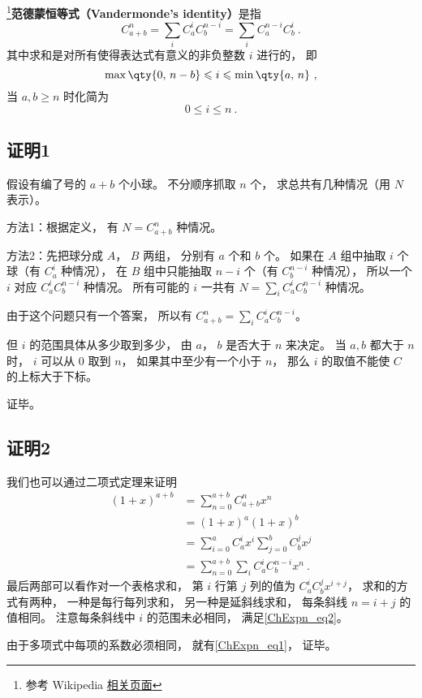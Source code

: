 

\footnote{参考 Wikipedia \href{https://en.wikipedia.org/wiki/Vandermonde's_identity}{相关页面}}\textbf{范德蒙恒等式（Vandermonde's identity）}是指
\begin{equation}\label{ChExpn_eq1}
C_{a + b}^n = \sum_i C_a^i C_b^{n-i} = \sum\limits_i C_a^{n-i}C_b^i~.
\end{equation}
其中求和是对所有使得表达式有意义的非负整数 $i$ 进行的， 即
\begin{equation}\label{ChExpn_eq2}
\max\qty{0,\, n-b} \leqslant i \leqslant \min\qty{a,\, n}~,
\end{equation}
当 $a, b \geqslant n$ 时化简为
\begin{equation}
0 \leqslant i \leqslant n~.
\end{equation}


\subsection{证明1}

假设有编了号的 $a+b$ 个小球。 不分顺序抓取 $n$ 个， 求总共有几种情况（用 $N$ 表示）。

方法1：根据定义， 有 $N = C_{a+b}^n$ 种情况。

方法2：先把球分成 $A$，  $B$ 两组， 分别有 $a$ 个和 $b$ 个。 如果在 $A$ 组中抽取 $i$ 个球（有 $C_a^i$ 种情况）， 在 $B$ 组中只能抽取  $n - i$ 个（有 $C_b^{n-i}$ 种情况）， 所以一个 $i$ 对应 $C_a^i C_b^{n-i}$ 种情况。 所有可能的 $i$ 一共有 $N = \sum_i C_a^i C_b^{n-i}$ 种情况。

由于这个问题只有一个答案， 所以有 $C_{a+b}^n = \sum_i C_a^i C_b^{n-i}$。 

但 $i$ 的范围具体从多少取到多少， 由 $a$，  $b$ 是否大于 $n$ 来决定。 当 $a,b$ 都大于 $n$ 时， $i$ 可以从 0 取到 $n$，  如果其中至少有一个小于 $n$，  那么 $i$ 的取值不能使 $C$ 的上标大于下标。

证毕。

\subsection{证明2}
我们也可以通过二项式定理来证明
\begin{equation}
\begin{aligned}
(1 + x)^{a+b} &= \sum_{n=0}^{a+b} C_{a+b}^n x^n\\
&=(1+x)^a (1+x)^b\\
&=\sum_{i=0}^a C_a^i x^i  \sum_{j=0}^b C_b^j x^j\\
&=\sum_{n=0}^{a+b} \sum_{i} C_a^i C_b^{n-i} x^n~.
\end{aligned}
\end{equation}
最后两部可以看作对一个表格求和， 第 $i$ 行第 $j$ 列的值为 $C_a^i C_b^j x^{i+j}$， 求和的方式有两种， 一种是每行每列求和， 另一种是延斜线求和， 每条斜线 $n = i+j$ 的值相同。 注意每条斜线中 $i$ 的范围未必相同， 满足\autoref{ChExpn_eq2}。

由于多项式中每项的系数必须相同， 就有\autoref{ChExpn_eq1}， 证毕。
